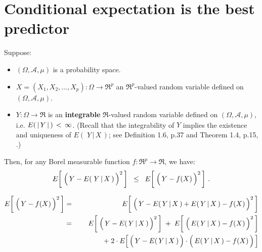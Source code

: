 

\section{Conditional expectation is the best predictor}
\setcounter{theorem}{0}
\setcounter{equation}{0}

\renewcommand{\theenumi}{\roman{enumi}}
\renewcommand{\labelenumi}{\textnormal{(\theenumi)}$\;\;$}


\begin{theorem}
\mbox{}
\vskip 0.2cm
\noindent
Suppose:
\begin{itemize}
\item
	$(\Omega,\mathcal{A},\mu)$ is a probability space.
\item
	$X = (X_{1}, X_{2}, \ldots, X_{p}) : \Omega \longrightarrow \Re^{p}$ an $\Re^{p}$-valued random variable
	defined on $(\Omega,\mathcal{A},\mu)$.
\item
	$Y : \Omega \longrightarrow \Re$ is an \textbf{\color{red}integrable} $\Re$-valued random variable
	defined on $(\Omega,\mathcal{A},\mu)$,
	i.e. $E(\,\vert\,\overset{{\color{white}.}}{Y}\,\vert\,)\,<\,\infty$.
	\vskip 0.01cm
	(Recall that the integrability of $Y$ implies the existence and uniqueness of $E\!\left(\;Y\,\vert\,X\,\right)$;
	see Definition 1.6, p.37 and Theorem 1.4, p.15, \cite{Shao2003}.)
\end{itemize}
Then, for any Borel measurable function $f : \Re^{p} \longrightarrow \Re$, we have:
\begin{equation*}
E\!\left[\;\left(\,Y \overset{{\color{white}.}}{-} E(\;Y\,\vert\,X\,)\,\right)^{2}\,\right]
\;\; \leq \;\;
E\!\left[\;\left(\,Y \overset{{\color{white}.}}{-} f(X)\,\right)^{2}\,\right]\,.
\end{equation*}
\end{theorem}
\proof
\begin{eqnarray*}
E\!\left[\;\left(\,Y \overset{{\color{white}.}}{-} f(X)\,\right)^{2}\,\right]
&=&
	E\!\left[\;\left(\,Y \overset{{\color{white}.}}{-} E(\,Y\,\vert\,X\,) + E(\,Y\,\vert\,X\,) - f(X)\,\right)^{2}\,\right]
\\
&=&
	{\color{white}+}\;\;
	E\!\left[\;\left(\,Y \overset{{\color{white}.}}{-} E(\,Y\,\vert\,X\,)\,\right)^{2}\,\right]
	\;+\;
	E\!\left[\;\left(\,E(\,Y\,\vert\,X\,) \overset{{\color{white}.}}{-} f(X)\,\right)^{2}\,\right]
\\
&&
	+\;
	2 \cdot E\!\left[\,
		\left(\,Y \overset{{\color{white}.}}{-} E(\,Y\,\vert\,X\,)\,\right)
		\cdot
		\left(\,E(\,Y\,\vert\,X\,) \overset{{\color{white}.}}{-} f(X)\,\right)
		\,\right]
\end{eqnarray*}
